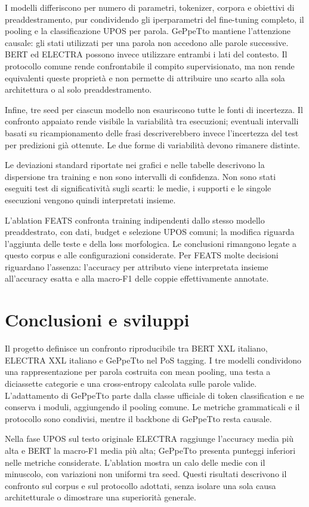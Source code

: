 \documentclass[12pt,a4paper]{report}
\begin{document}
I modelli differiscono per numero di parametri, tokenizer, corpora e obiettivi di preaddestramento, pur condividendo gli iperparametri del fine-tuning completo, il pooling e la classificazione UPOS per parola. GePpeTto mantiene l'attenzione causale: gli stati utilizzati per una parola non accedono alle parole successive. BERT ed ELECTRA possono invece utilizzare entrambi i lati del contesto. Il protocollo comune rende confrontabile il compito supervisionato, ma non rende equivalenti queste proprietà e non permette di attribuire uno scarto alla sola architettura o al solo preaddestramento.

Infine, tre seed per ciascun modello non esauriscono tutte le fonti di incertezza. Il confronto appaiato rende visibile la variabilità tra esecuzioni; eventuali intervalli basati su ricampionamento delle frasi descriverebbero invece l'incertezza del test per predizioni già ottenute. Le due forme di variabilità devono rimanere distinte.

Le deviazioni standard riportate nei grafici e nelle tabelle descrivono la dispersione tra training e non sono intervalli di confidenza. Non sono stati eseguiti test di significatività sugli scarti: le medie, i supporti e le singole esecuzioni vengono quindi interpretati insieme.

L'ablation FEATS confronta training indipendenti dallo stesso modello preaddestrato, con dati, budget e selezione UPOS comuni; la modifica riguarda l'aggiunta delle teste e della loss morfologica. Le conclusioni rimangono legate a questo corpus e alle configurazioni considerate. Per FEATS molte decisioni riguardano l'assenza: l'accuracy per attributo viene interpretata insieme all'accuracy esatta e alla macro-F1 delle coppie effettivamente annotate.

\chapter{Conclusioni e sviluppi}
Il progetto definisce un confronto riproducibile tra BERT XXL italiano, ELECTRA XXL italiano e GePpeTto nel PoS tagging. I tre modelli condividono una rappresentazione per parola costruita con mean pooling, una testa a diciassette categorie e una cross-entropy calcolata sulle parole valide. L'adattamento di GePpeTto parte dalla classe ufficiale di token classification e ne conserva i moduli, aggiungendo il pooling comune. Le metriche grammaticali e il protocollo sono condivisi, mentre il backbone di GePpeTto resta causale.

Nella fase UPOS sul testo originale ELECTRA raggiunge l'accuracy media più alta e BERT la macro-F1 media più alta; GePpeTto presenta punteggi inferiori nelle metriche considerate. L'ablation mostra un calo delle medie con il minuscolo, con variazioni non uniformi tra seed. Questi risultati descrivono il confronto sul corpus e sul protocollo adottati, senza isolare una sola causa architetturale o dimostrare una superiorità generale.
\end{document}
